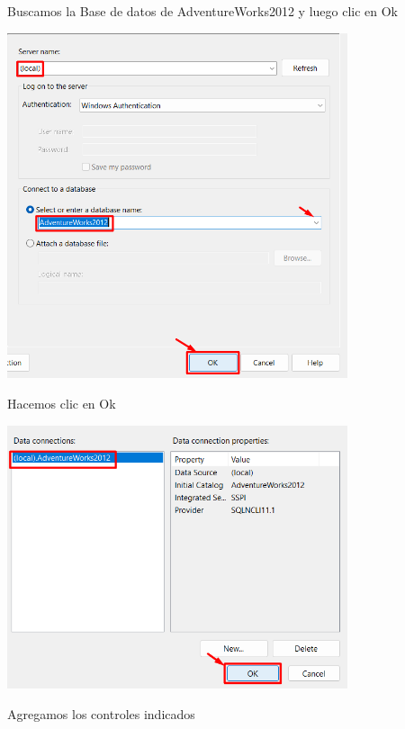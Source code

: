 \documentclass[12pt,letterpaper]{article}
\begin{document}
Buscamos la Base de datos de AdventureWorks2012 y luego clic en Ok

\begin{center}
    \includegraphics[width=10cm]{./img/img18.png}
\end{center}

Hacemos clic en Ok

\begin{center}
    \includegraphics[width=10cm]{./img/img19.png}
\end{center}

Agregamos los controles indicados 
\end{document}
